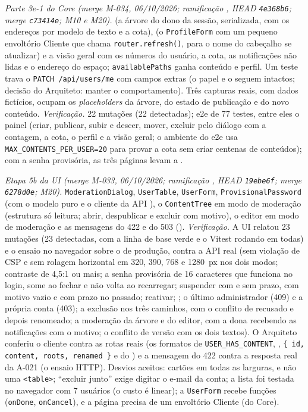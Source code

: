 \emph{Parte 3e-1 do Core (merge M-034, 06/10/2026; ramificação , HEAD \texttt{4e368b6}; merge \texttt{c73414e}; M10 e M20).}  (a árvore do dono da sessão, serializada, com os endereços por modelo de texto e a cota),  (o \texttt{ProfileForm} com um pequeno envoltório Cliente que chama \texttt{router.refresh()}, para o nome do cabeçalho se atualizar) e a visão geral com os números do usuário, a cota, as notificações não lidas e o endereço do espaço; \texttt{availablePaths} ganha conteúdo e perfil. Um teste trava o \texttt{PATCH /api/users/me} com campos extras (o papel e o  seguem intactos; decisão do Arquiteto: manter o comportamento). Três capturas reais, com dados fictícios, ocupam os \emph{placeholders} da árvore, do estado de publicação e do novo conteúdo. \emph{Verificação.} 22 mutações (22 detectadas); e2e de 77 testes, entre eles o painel (criar, publicar, subir e descer, mover, excluir pelo diálogo com a contagem, a cota, o perfil e a visão geral; o ambiente do e2e usa \texttt{MAX\_CONTENTS\_PER\_USER=20} para provar a cota sem criar centenas de conteúdos); com a senha provisória, as três páginas levam a .

\emph{Etapa 5b da UI (merge M-033, 06/10/2026; ramificação , HEAD \texttt{19ebe6f}; merge \texttt{6278d0e}; M20).} \texttt{ModerationDialog}, \texttt{UserTable}, \texttt{UserForm}, \texttt{ProvisionalPassword} (com o modelo puro  e o cliente da API ), o \texttt{ContentTree} em modo de moderação (estrutura só leitura; abrir, despublicar e excluir com motivo), o editor em modo de moderação e as mensagens do 422  e do 503  (). \emph{Verificação.} A UI relatou 23 mutações (23 detectadas, com a linha de base verde e o Vitest rodando em todas) e o ensaio no navegador sobre o  de produção, contra a API real (sem violação de CSP e sem rolagem horizontal em 320, 390, 768 e 1280~px nos dois modos; contraste de 4,5:1 ou mais; a senha provisória de 16 caracteres que funciona no login, some ao fechar e não volta ao recarregar; suspender com e sem prazo, com motivo vazio e com prazo no passado; reativar; ; o último administrador (409) e a própria conta (403); a exclusão nos três caminhos, com o conflito de  recusado e depois renomeado; a moderação da árvore e do editor, com a dona recebendo as notificações com o motivo; o conflito de versão com os dois textos). O Arquiteto conferiu o cliente contra as rotas reais (os formatos de \texttt{USER\_HAS\_CONTENT}, , \texttt{\{ id, content, roots, renamed \}} e do ) e a mensagem do 422 contra a resposta real da A-021 (o ensaio HTTP). Desvios aceitos: cartões em todas as larguras, e não uma \texttt{<table>}; ``excluir junto'' exige digitar o e-mail da conta; a lista foi testada no navegador com 7 usuários (o custo é linear); a \texttt{UserForm} recebe funções (\texttt{onDone}, \texttt{onCancel}), e a página  precisa de um envoltório Cliente (do Core).

